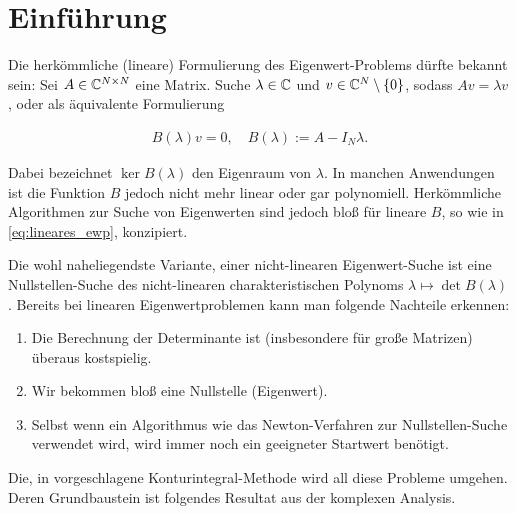 \section{Einführung}

Die herkömmliche (lineare) Formulierung des Eigenwert-Problems dürfte bekannt sein:
Sei $A \in \mathbb{C}^{N \times N}$ eine Matrix.
Suche $\lambda \in \mathbb{C}$ und $v \in \mathbb{C}^N \setminus {\left \{ 0 \right \}}$, sodass $A v = \lambda v$, oder als äquivalente Formulierung

\begin{align} \label{eq:lineares_ewp}
    B(\lambda) v = 0,
    \quad
    B(\lambda) := A - I_N \lambda.
\end{align}

Dabei bezeichnet $\ker B(\lambda)$ den Eigenraum von $\lambda$.
In manchen Anwendungen ist die Funktion $B$ jedoch nicht mehr linear oder gar polynomiell.
Herkömmliche Algorithmen zur Suche von Eigenwerten sind jedoch bloß für lineare $B$, so wie in \eqref{eq:lineares_ewp}, konzipiert.

Die wohl naheliegendste Variante, einer nicht-linearen Eigenwert-Suche ist eine Nullstellen-Suche des nicht-linearen charakteristischen Polynoms $\lambda \mapsto \det B(\lambda)$.
Bereits bei linearen Eigenwertproblemen kann man folgende Nachteile erkennen:

\begin{enumerate}[label = \arabic*.]
    \item Die Berechnung der Determinante ist (insbesondere für große Matrizen) überaus kostspielig.
    \item Wir bekommen bloß eine Nullstelle (Eigenwert).
    \item Selbst wenn ein Algorithmus wie das Newton-Verfahren zur Nullstellen-Suche verwendet wird, wird immer noch ein geeigneter Startwert benötigt.
\end{enumerate}

Die, in \cite{BEYN20123839} vorgeschlagene Konturintegral-Methode wird all diese Probleme umgehen.
Deren Grundbaustein ist folgendes Resultat aus der komplexen Analysis.
